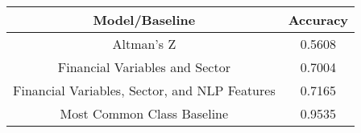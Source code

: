 \footnotesize
\begin{tabular}{cc}
\toprule
Model/Baseline & Accuracy \\
\midrule
Altman's Z & 0.5608 \\
Financial Variables and Sector & 0.7004 \\
Financial Variables, Sector, and NLP Features & 0.7165 \\
Most Common Class Baseline & 0.9535 \\
\bottomrule
\end{tabular}

\normalsize